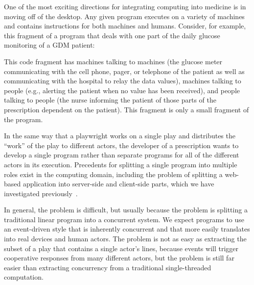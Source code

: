 One of the most exciting directions for integrating computing into
medicine is in moving off of the desktop. Any given \poppl{} program
executes on a variety of machines and contains instructions for both
machines and humans. Consider, for example, this fragment of a
\poppl{} program that deals with one part of the daily glucose
monitoring of a GDM patient:

\begin{center}
\end{center}

This code fragment has machines talking to machines (the glucose meter
communicating with the cell phone, pager, or telephone of the patient
as well as communicating with the hospital to relay the data values),
machines talking to people (e.g., alerting the patient when no value
has been received), and people talking to people (the nurse informing
the patient of those parts of the prescription dependent on the
patient). This fragment is only a small fragment of the program.

In the same way that a playwright works on a single play and
distributes the ``work'' of the play to different actors, the
developer of a prescription wants to develop a single program rather
than separate programs for all of the different actors in its
execution. Precedents for splitting a single program into multiple
roles exist in the computing domain, including the problem of
splitting a web-based application into server-side and client-side
parts, which we have investigated previously~\citep{mfgkf:asej2004}.

In general, the problem is difficult, but usually because the problem
is splitting a traditional linear program into a concurrent system.
We expect \poppl{} programs to use an event-driven style that is
inherently concurrent and that more easily translates into real
devices and human actors. The problem is not as easy as extracting the
subset of a play that contains a single actor's lines, because events
will trigger cooperative responses from many different actors, but the
problem is still far easier than extracting concurrency from a
traditional single-threaded computation.

